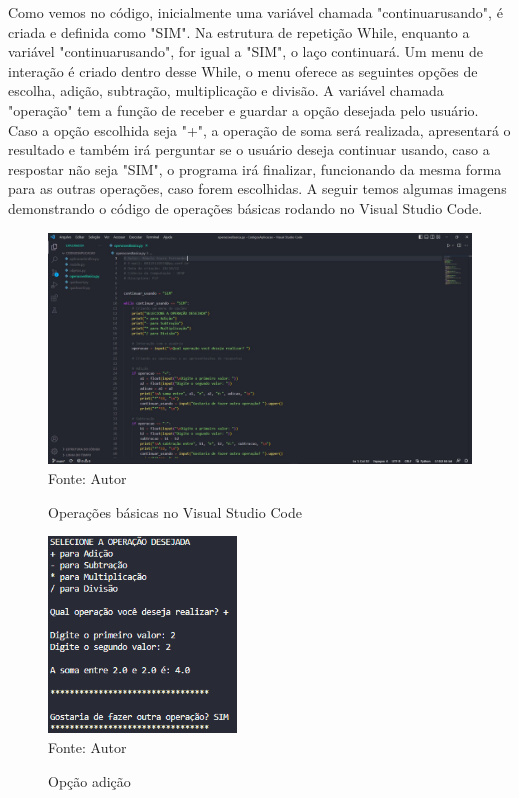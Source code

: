 	Como vemos no código, inicialmente uma variável chamada "continuar\textunderscore usando", é criada e definida como "SIM". Na estrutura de repetição While, enquanto a variável "continuar\textunderscore usando", for igual a "SIM", o laço continuará. Um menu de interação é criado dentro desse While, o menu oferece as seguintes opções de escolha, adição, subtração, multiplicação e divisão. A variável chamada "operação" tem a função de receber e guardar a opção desejada pelo usuário. Caso a opção escolhida seja "+", a operação de soma será realizada, apresentará o resultado e também irá perguntar se o usuário deseja continuar usando, caso a respostar não seja "SIM", o programa irá finalizar, funcionando da mesma forma para as outras operações, caso forem escolhidas. A seguir temos algumas imagens demonstrando o código de operações básicas rodando no Visual Studio Code.
	
	\begin{figure}[H]
		\begin{center}
			\caption{Operações básicas no Visual Studio Code} \label{ling1}
			\includegraphics[width=12cm]{operacaocode.JPG} \\
			{\tiny \sf Fonte:{ Autor}}
		\end{center}
	\end{figure}
	
	\begin{figure}[H]
		\begin{center}
			\caption{Opção adição} \label{ling1}
			\includegraphics[width=5cm]{soma.PNG} \\
			{\tiny \sf Fonte:{ Autor}}
		\end{center}
	\end{figure}

